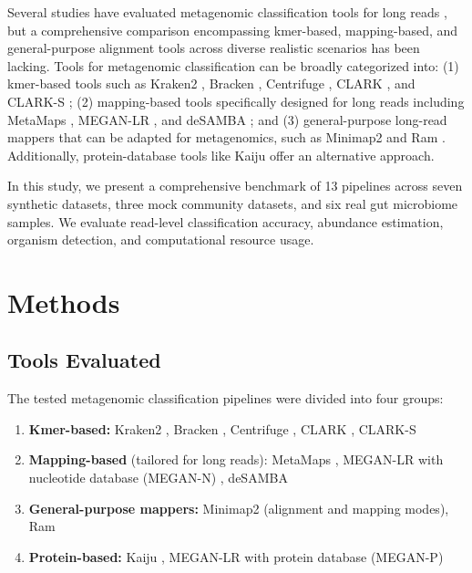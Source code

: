 \documentclass{article}
\begin{document}
Several studies have evaluated metagenomic classification tools for long reads \citep{portik2022evaluation}, but a comprehensive comparison encompassing kmer-based, mapping-based, and general-purpose alignment tools across diverse realistic scenarios has been lacking. Tools for metagenomic classification can be broadly categorized into: (1) kmer-based tools such as Kraken2 \citep{wood2019improved}, Bracken \citep{lu2017bracken}, Centrifuge \citep{kim2016centrifuge}, CLARK \citep{ounit2015clark}, and CLARK-S \citep{ounit2016clarks}; (2) mapping-based tools specifically designed for long reads including MetaMaps \citep{dilthey2019strain}, MEGAN-LR \citep{huson2018megan}, and deSAMBA \citep{liu2021fast}; and (3) general-purpose long-read mappers that can be adapted for metagenomics, such as Minimap2 \citep{li2018minimap2} and Ram \citep{vaser2021time}. Additionally, protein-database tools like Kaiju \citep{menzel2016fast} offer an alternative approach.

In this study, we present a comprehensive benchmark of 13 pipelines across seven synthetic datasets, three mock community datasets, and six real gut microbiome samples. We evaluate read-level classification accuracy, abundance estimation, organism detection, and computational resource usage.

\section{Methods}

\subsection{Tools Evaluated}

The tested metagenomic classification pipelines were divided into four groups:
\begin{enumerate}
    \item \textbf{Kmer-based:} Kraken2 \citep{wood2019improved}, Bracken \citep{lu2017bracken}, Centrifuge \citep{kim2016centrifuge}, CLARK \citep{ounit2015clark}, CLARK-S \citep{ounit2016clarks}
    \item \textbf{Mapping-based} (tailored for long reads): MetaMaps \citep{dilthey2019strain}, MEGAN-LR with nucleotide database (MEGAN-N) \citep{huson2018megan}, deSAMBA \citep{liu2021fast}
    \item \textbf{General-purpose mappers:} Minimap2 \citep{li2018minimap2} (alignment and mapping modes), Ram \citep{vaser2021time}
    \item \textbf{Protein-based:} Kaiju \citep{menzel2016fast}, MEGAN-LR with protein database (MEGAN-P)
\end{enumerate}
\end{document}
